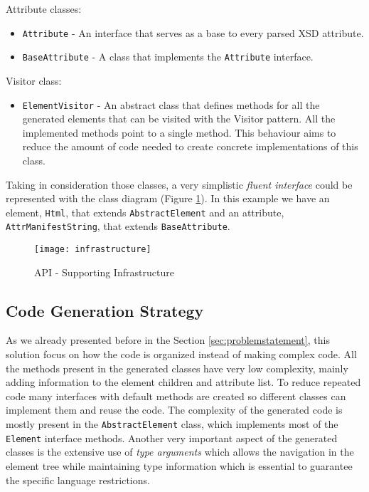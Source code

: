 Attribute classes:

\begin{itemize}  
	\item \texttt{Attribute} - An interface that serves as a base to every parsed \ac{XSD} attribute.
	\item \texttt{BaseAttribute} - A class that implements the \texttt{Attribute} interface. 
\end{itemize}

Visitor class:

\begin{itemize}
	\item \texttt{ElementVisitor} - An abstract class that defines methods for all the generated elements that can be visited with the Visitor pattern. All the implemented methods point to a single method. This behaviour aims to reduce the amount of code needed to create concrete implementations of this class.
\end{itemize}

\noindent
Taking in consideration those classes, a very simplistic \textit{fluent interface} could be represented with the class diagram (Figure \ref{img:infrastructure}). In this example we have an element, \texttt{Html}, that extends \texttt{AbstractElement} and an attribute, \texttt{AttrManifestString}, that extends \texttt{BaseAttribute}. 

\begin{figure}[H]
	\centering
	\texttt{[image: infrastructure]}
	\caption{API - Supporting Infrastructure}
	\label{img:infrastructure}
\end{figure}

\subsection{Code Generation Strategy}
\label{sec:codegenerationstrategy}

As we already presented before in the Section \ref{sec:problemstatement}, this solution focus on how the code is organized instead of making complex code. All the methods present in the generated classes have very low complexity, mainly adding information to the element children and attribute list. To reduce repeated code many interfaces with default methods are created so different classes can implement them and reuse the code. The complexity of the generated code is mostly present in the \texttt{AbstractElement} class, which implements most of the \texttt{Element} interface methods. Another very important aspect of the generated classes is the extensive use of \textit{type arguments} which allows the navigation in the element tree while maintaining type information which is essential to guarantee the specific language restrictions.

